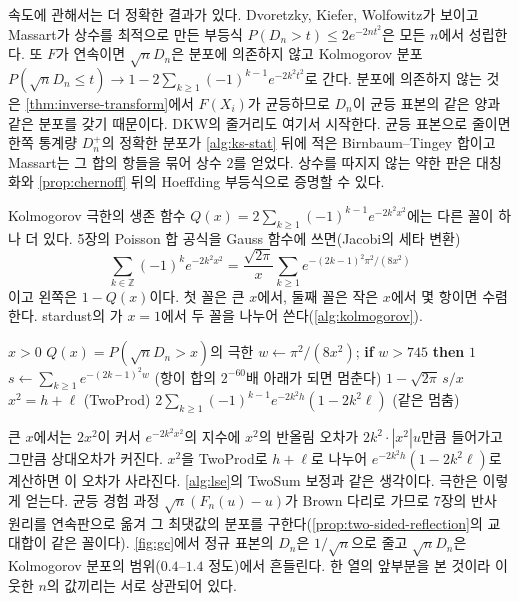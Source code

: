 속도에 관해서는 더 정확한 결과가 있다. Dvoretzky, Kiefer, Wolfowitz\cite{dvoretzky1956}가 보이고 Massart\cite{massart1990}가 상수를 최적으로 만든 부등식 $P(D_n>t)\le2e^{-2nt^2}$은 모든 $n$에서 성립한다. 또 $F$가 연속이면 $\sqrt nD_n$은 분포에 의존하지 않고 Kolmogorov 분포 $P(\sqrt nD_n\le t)\to1-2\sum_{k\ge1}(-1)^{k-1}e^{-2k^2t^2}$로 간다\cite{kolmogorov1933ks}. 분포에 의존하지 않는 것은 \cref{thm:inverse-transform}에서 $F(X_i)$가 균등하므로 $D_n$이 균등 표본의 같은 양과 같은 분포를 갖기 때문이다. DKW의 줄거리도 여기서 시작한다. 균등 표본으로 줄이면 한쪽 통계량 $D_n^+$의 정확한 분포가 \cref{alg:ks-stat} 뒤에 적은 Birnbaum--Tingey 합이고 Massart는 그 합의 항들을 묶어 상수 $2$를 얻었다\cite{massart1990}. 상수를 따지지 않는 약한 판은 대칭화와 \cref{prop:chernoff} 뒤의 Hoeffding 부등식으로 증명할 수 있다.

Kolmogorov 극한의 생존 함수 $Q(x)=2\sum_{k\ge1}(-1)^{k-1}e^{-2k^2x^2}$에는 다른 꼴이 하나 더 있다. 5장의 Poisson 합 공식을 Gauss 함수에 쓰면(Jacobi의 세타 변환)
\[
\sum_{k\in\mathbb Z}(-1)^ke^{-2k^2x^2}=\frac{\sqrt{2\pi}}x\sum_{k\ge1}e^{-(2k-1)^2\pi^2/(8x^2)}
\]
이고 왼쪽은 $1-Q(x)$이다. 첫 꼴은 큰 $x$에서, 둘째 꼴은 작은 $x$에서 몇 항이면 수렴한다. stardust의 가 $x=1$에서 두 꼴을 나누어 쓴다(\cref{alg:kolmogorov}).

\begin{algorithm}[htbp]
\begin{algorithmic}[1]
\Require $x>0$
\Ensure $Q(x)=P(\sqrt nD_n>x)$의 극한
  \State $w\gets\pi^2/(8x^2)$; \textbf{if} $w>745$ \textbf{then} \Return $1$
  \State $s\gets\sum_{k\ge1}e^{-(2k-1)^2w}$ (항이 합의 $2^{-60}$배 아래가 되면 멈춘다)
  \State \Return $1-\sqrt{2\pi}\,s/x$
\Else
  \State $x^2=h+\ell$ (TwoProd) 
  \State \Return $2\sum_{k\ge1}(-1)^{k-1}e^{-2k^2h}(1-2k^2\ell)$ (같은 멈춤)
\EndIf
\end{algorithmic}
\caption{Kolmogorov 분포의 생존 함수 (stardust 의 )}
\label{alg:kolmogorov}
\end{algorithm}

큰 $x$에서는 $2x^2$이 커서 $e^{-2k^2x^2}$의 지수에 $x^2$의 반올림 오차가 $2k^2\cdot|x^2|u$만큼 들어가고 그만큼 상대오차가 커진다. $x^2$을 TwoProd로 $h+\ell$로 나누어 $e^{-2k^2h}(1-2k^2\ell)$로 계산하면 이 오차가 사라진다. \cref{alg:lse}의 TwoSum 보정과 같은 생각이다. 극한은 이렇게 얻는다. 균등 경험 과정 $\sqrt n(F_n(u)-u)$가 Brown 다리로 가므로 7장의 반사 원리를 연속판으로 옮겨 그 최댓값의 분포를 구한다(\cref{prop:two-sided-reflection}의 교대합이 같은 꼴이다). \cref{fig:gc}에서 정규 표본의 $D_n$은 $1/\sqrt n$으로 줄고 $\sqrt nD_n$은 Kolmogorov 분포의 범위($0.4$--$1.4$ 정도)에서 흔들린다. 한 열의 앞부분을 본 것이라 이웃한 $n$의 값끼리는 서로 상관되어 있다.

